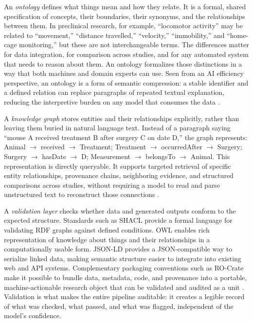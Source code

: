 \documentclass[man,12pt,donotrepeattitle]{apa7}
\begin{document}
An \textit{ontology} defines what things mean and how they relate. It is a
formal, shared specification of concepts, their boundaries, their synonyms,
and the relationships between them. In preclinical research, for example,
``locomotor activity'' may be related to ``movement,'' ``distance
travelled,'' ``velocity,'' ``immobility,'' and ``home-cage monitoring,''
but these are not interchangeable terms. The differences matter for data
integration, for comparison across studies, and for any automated system
that needs to reason about them. An ontology formalizes those distinctions
in a way that both machines and domain experts can use. Seen from an AI
efficiency perspective, an ontology is a form of semantic compression: a
stable identifier and a defined relation can replace paragraphs of repeated
textual explanation, reducing the interpretive burden on any model that
consumes the data \parencite{sharma2024,batista2022}.

A \textit{knowledge graph} stores entities and their relationships
explicitly, rather than leaving them buried in natural language text.
Instead of a paragraph saying ``mouse A received treatment B after surgery C
on date D,'' the graph represents: Animal $\rightarrow$ received
$\rightarrow$ Treatment; Treatment $\rightarrow$ occurredAfter $\rightarrow$
Surgery; Surgery $\rightarrow$ hasDate $\rightarrow$ D; Measurement
$\rightarrow$ belongsTo $\rightarrow$ Animal. This representation is
directly queryable. It supports targeted retrieval of specific entity
relationships, provenance chains, neighboring evidence, and structured
comparisons across studies, without requiring a model to read and parse
unstructured text to reconstruct those connections \parencite{callahan2024,ma2025}.

A \textit{validation layer} checks whether data and generated outputs
conform to the expected structure. Standards such as SHACL provide a formal
language for validating RDF graphs against defined conditions. OWL enables
rich representation of knowledge about things and their relationships in a
computationally usable form. JSON-LD provides a JSON-compatible way to
serialize linked data, making semantic structure easier to integrate into
existing web and API systems. Complementary packaging conventions such as
RO-Crate make it possible to bundle data, metadata, code, and provenance
into a portable, machine-actionable research object that can be validated
and audited as a unit \parencite{soilandreyes2022}. Validation is what makes
the entire pipeline auditable: it creates a legible record of what was
checked, what passed, and what was flagged, independent of the model's
confidence.
\end{document}
